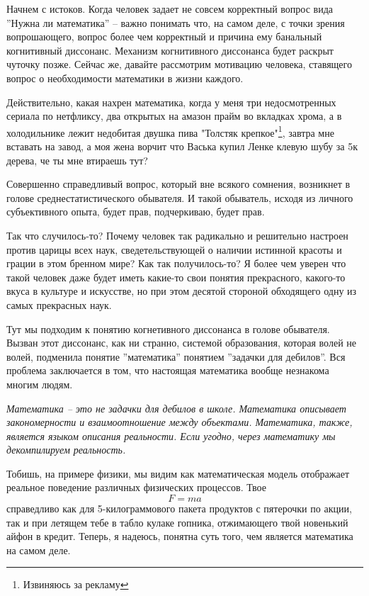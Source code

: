 Начнем с истоков.
Когда человек задает не совсем корректный вопрос вида ''Нужна ли математика'' -- важно понимать что, на самом деле,
с точки зрения вопрошающего, вопрос более чем корректный и причина ему банальный когнитивный диссонанс.
Механизм когнитивного диссонанса будет раскрыт чуточку позже.
Сейчас же, давайте рассмотрим мотивацию человека, ставящего вопрос о необходимости математики в жизни каждого.

Действительно, какая нахрен математика, когда у меня три недосмотренных сериала по нетфликсу, два открытых на амазон прайм
во вкладках хрома, а в холодильнике лежит недобитая двушка пива "Толстяк крепкое"\footnote{Извиняюсь за рекламу},
завтра мне вставать на завод, а моя жена ворчит что Васька купил Ленке клевую шубу за 5к дерева, че ты мне втираешь тут?

Совершенно справедливый вопрос, который вне всякого сомнения, возникнет в голове среднестатистического обывателя.
И такой обыватель, исходя из личного субъективного опыта, будет прав, подчеркиваю, будет прав.

Так что случилось-то?
Почему человек так радикально и решительно настроен против царицы всех наук, сведетельствующей о наличии истинной красоты
и грации в этом бренном мире?
Как так получилось-то?
Я более чем уверен что такой человек даже будет иметь какие-то свои понятия прекрасного, какого-то вкуса в культуре и искусстве,
но при этом десятой стороной обходящего одну из самых прекрасных наук.

Тут мы подходим к понятию когнетивного диссонанса в голове обывателя.
Вызван этот диссонанс, как ни странно, системой образования, которая волей не волей, подменила понятие ''математика'' понятием
''задачки для дебилов''.
Вся проблема заключается в том, что настоящая математика вообще незнакома многим людям.

\begin{displayquote}
    \textit{
        Математика -- это не задачки для дебилов в школе.
        Математика описывает закономерности и взаимоотношение между объектами.
        Математика, также, является языком описания реальности.
        Если угодно, через математику мы декомпилируем реальность.
    }
\end{displayquote}
Тобишь, на примере физики, мы видим как математическая модель отображает реальное поведение различных физических процессов.
Твое
\[F = ma\]
справедливо как для 5-килограммового пакета продуктов с пятерочки по акции, так и при летящем тебе в табло кулаке гопника,
отжимающего твой новенький айфон в кредит.
Теперь, я надеюсь, понятна суть того, чем является математика на самом деле.

